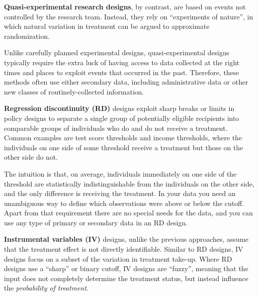 
\textbf{Quasi-experimental research designs},
by contrast, are based on events not controlled by the research team.
Instead, they rely on ``experiments of nature'',
in which natural variation in treatment can be argued to approximate randomization.

Unlike carefully planned experimental designs,
quasi-experimental designs typically require the extra luck
of having access to data collected at the right times and places
to exploit events that occurred in the past.
Therefore, these methods often use either secondary data,
including administrative data or other new classes of routinely-collected information.


\textbf{Regression discontinuity (RD)}
designs exploit sharp breaks or limits
in policy designs to separate a single group of potentially eligible recipients
into comparable groups of individuals who do and do not receive a treatment.
Common examples are test score thresholds and income thresholds,
where the individuals on one side of some threshold receive
a treatment but those on the other side do not.

The intuition is that, on average,
individuals immediately on one side of the threshold
are statistically indistinguishable from the individuals on the other side,
and the only difference is receiving the treatment.
In your data you need an unambiguous way
to define which observations were above or below the cutoff.
Apart from that requirement there are no special needs for the data,
and you can use any type of primary or secondary data in an RD design.


\textbf{Instrumental variables (IV)}
designs, unlike the previous approaches,
assume that the treatment effect is not directly identifiable.
Similar to RD designs,
IV designs focus on a subset of the variation in treatment take-up.
Where RD designs use a ``sharp'' or binary cutoff,
IV designs are ``fuzzy'', meaning that the input does not completely determine
the treatment status, but instead influence the \textit{probability of treatment}.


